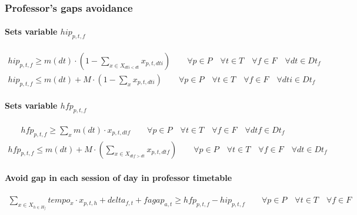 	
	
\subsubsection{Professor's gaps avoidance}
	
\paragraph{Sets variable $hip_{p,t,f}$}
\begin{eqnarray}
hip_{p,t,f} \geq m(dt) \cdot ( 1 - \sum\limits_{x \in X_{dti<dt}} x_{p,t,dti} ) \nonumber \qquad
\forall p \in P \quad
\forall t \in T \quad
\forall f \in F \quad
\forall dt \in Dt_{f}
\end{eqnarray}
\begin{eqnarray}
hip_{p,t,f} \leq m(dt) + M \cdot ( 1 - \sum\limits_{x} x_{p,t,dti} ) \nonumber \qquad
\forall p \in P \quad
\forall t \in T \quad
\forall f \in F \quad
\forall dti \in Dt_{f}
\end{eqnarray}

\paragraph{Sets variable $hfp_{p,t,f}$}
\begin{eqnarray}
hfp_{p,t,f} \geq \sum\limits_{x} m(dt) \cdot x_{p,t,dtf} \nonumber \qquad
\forall p \in P \quad
\forall t \in T \quad
\forall f \in F \quad
\forall dtf \in Dt_{f}
\end{eqnarray}
\begin{eqnarray}
hfp_{p,t,f} \leq m(dt) + M \cdot ( \sum\limits_{x \in X_{dtf>dt}} x_{p,t,dtf} ) \nonumber \qquad
\forall p \in P \quad
\forall t \in T \quad
\forall f \in F \quad
\forall dt \in Dt_{f}
\end{eqnarray}

\paragraph{Avoid gap in each session of day in professor timetable}
\begin{eqnarray}
\sum\limits_{x \in X_{h \in H_{f}}} tempo_{x} \cdot x_{p,t,h} + delta_{f,t} + fagap_{a,t} \geq hfp_{p,t,f} - hip_{p,t,f} \nonumber \qquad
\forall p \in P \quad
\forall t \in T \quad
\forall f \in F
\end{eqnarray}


